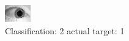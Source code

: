 \begin{figure}[h!]
\begin{center}
\includegraphics[width=0.60\columnwidth]{figures/ID1581_class_2_target_1.png}
\end{center}
\caption{ Classification: 2 actual target: 1}
\label{fig:ID1581_class_2_target_1}
\end{figure}
